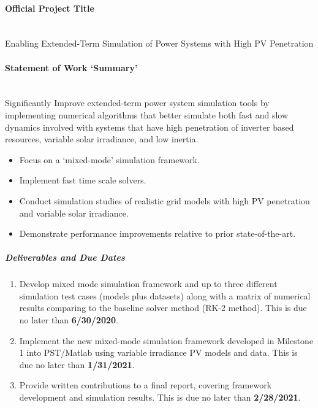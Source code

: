 \documentclass[12pt]{article}
\begin{document}
\paragraph{Official Project Title} \ \\
Enabling Extended-Term Simulation of Power Systems with High PV Penetration
\paragraph{Statement of Work `Summary'} \ \\
Significantly Improve extended-term power system simulation tools by implementing numerical algorithms that better simulate both fast and slow dynamics involved with systems that have high penetration of inverter based resources, variable solar irradiance, and low inertia.
\begin{itemize}

\item  Focus on a `mixed-mode' simulation framework.
\item  Implement fast time scale solvers.
\item  Conduct simulation studies of realistic grid models with high PV penetration and variable solar irradiance.
\item Demonstrate performance improvements relative to prior state-of-the-art.

\end{itemize}
\subparagraph{Deliverables and Due Dates}
\begin{enumerate}
\item Develop mixed mode simulation framework and up to three different simulation test cases (models plus datasets) along with a matrix of numerical results comparing to the baseline solver method (RK-2 method).
This is due no later than \textbf{6/30/2020}.
\item Implement the new mixed-mode simulation framework developed in Milestone 1 into PST/Matlab using variable irradiance PV models and data.
This is due no later than   \textbf{1/31/2021}.
\item Provide written contributions to a final report, covering framework development and simulation results.
This is due no later than  \textbf{2/28/2021}.
\end{enumerate}
\end{document}
